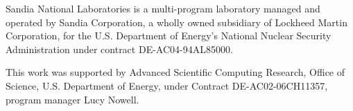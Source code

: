 \documentclass[conference]{IEEEtran}
\begin{document}
Sandia National Laboratories is a multi-program laboratory managed and operated
by Sandia Corporation, a wholly owned subsidiary of Lockheed Martin
Corporation, for the U.S. Department of Energy's National Nuclear Security
Administration under contract DE-AC04-94AL85000.

This work was supported by Advanced Scientific Computing Research, Office of
Science, U.S. Department of Energy, under Contract DE-AC02-06CH11357, program
manager Lucy Nowell.




\vfill\eject
\end{document}
